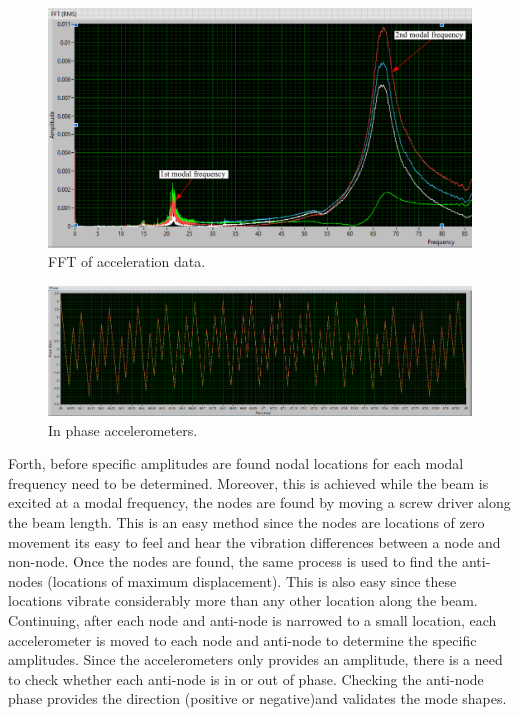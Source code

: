 \documentclass[12pt,letter]{article}
\numberwithin{ex}{section} %
\numberwithin{re}{section} %
\begin{document}
\begin{figure}[t]
	\centering 
	\includegraphics*[width= 1\linewidth]{figures/FFT/FFT.png}
	\caption{FFT of acceleration data.}
	\label{fig:FFT}
\end{figure}



\begin{figure}[h]
	\centering 
	\includegraphics*[width= 1\linewidth]{figures/InPhase/InPhase.png}
	\caption{In phase accelerometers.}
	\label{fig:InPhase}
\end{figure}



Forth, before specific amplitudes are found nodal locations for each modal frequency need to be determined. Moreover, this is achieved while the beam is excited at a modal frequency, the nodes are found by moving a screw driver along the beam length. This is an easy method since the nodes are locations of zero movement its easy to feel and hear the vibration differences between a node and non-node. Once the nodes are found, the same process is used to find the anti-nodes (locations of maximum displacement). This is also easy since these locations vibrate considerably more than any other location along the beam. Continuing, after each node and anti-node is narrowed to a small location, each accelerometer is moved to each node and anti-node to determine the specific amplitudes. Since the accelerometers only provides an amplitude, there is a need to check whether each anti-node is in or out of phase. Checking the anti-node phase provides the direction (positive or negative)and validates the mode shapes. 
\end{document}
